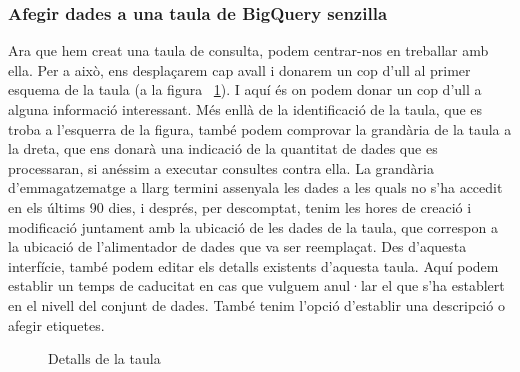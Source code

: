 \documentclass[12pt,longbibliography]{article}
\theoremstyle{definition}
\theoremstyle{remark}
\begin{document}
\subsubsection{Afegir dades a una taula de BigQuery senzilla}

Ara que hem creat una taula de consulta, podem centrar-nos en treballar amb ella. Per a això, ens desplaçarem cap avall i donarem un cop d'ull al primer esquema de la taula (a la figura ~\ref{fig:bq9}). I aquí és on podem donar un cop d'ull a alguna informació interessant. Més enllà de la identificació de la taula, que es troba a l'esquerra de la figura, també podem comprovar la grandària de la taula a la dreta, que ens donarà una indicació de la quantitat de dades que es processaran, si anéssim a executar consultes contra ella. La grandària d'emmagatzematge a llarg termini assenyala les dades a les quals no s'ha accedit en els últims 90 dies, i després, per descomptat, tenim les hores de creació i modificació juntament amb la ubicació de les dades de la taula, que correspon a la ubicació de l'alimentador de dades que va ser reemplaçat. Des d'aquesta interfície, també podem editar els detalls existents d'aquesta taula. Aquí podem establir un temps de caducitat en cas que vulguem anul·lar el que s'ha establert en el nivell del conjunt de dades. També tenim l'opció d'establir una descripció o afegir etiquetes.

\vspace{2mm}
\begin{figure}[h!]
\par
{}%
\hfill
{}%
\par

\caption{Detalls de la taula}
\label{fig:bq9}
\end{figure}
\vspace{2mm}
\end{document}
